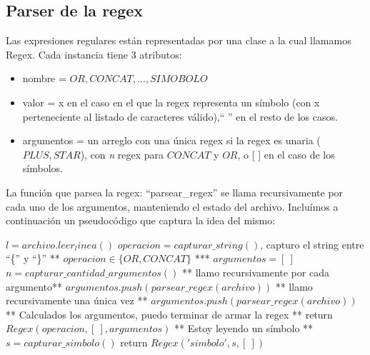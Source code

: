 \subsection{Parser de la regex}
Las expresiones regulares están representadas por una clase a la cual llamamos Regex.
Cada instancia tiene 3 atributos:
\begin{itemize}
	\item nombre = $OR, CONCAT, \ldots , SIMOBOLO$
	\item valor = x en el caso en el que la regex representa un símbolo (con x perteneciente al listado de caracteres válido),`` '' en el resto de los casos.
	\item argumentos = un arreglo con una única regex si la regex es unaria ($PLUS, STAR$), con \emph{n} regex para $CONCAT$ y $OR$, o [ ] en el caso de los símbolos.
\end{itemize}
La función que parsea la regex: ``parsear\_regex'' se llama recursivamente por cada uno de los argumentos, manteniendo el estado del archivo. Incluímos a continuación un pseudocódigo que captura la idea del mismo:

\begin{algorithm}
  \begin{algorithmic}
      \State $l = archivo.leer_linea()$
        \State $operacion = capturar\_string()$, capturo el string entre ``\{'' y ``\}''
          \State \/** $operacion \in \{OR, CONCAT\}$ \/***
          \State $argumentos = [ \ ]$
          \State $n = capturar\_cantidad\_argumentos()$
            \State \/** llamo recursivamente por cada argumento\/**
            \State $argumentos.push(parsear\_regex(archivo))$
          \EndFor
        \Else
          \State \/** llamo recursivamente una única vez \/**
            \State $argumentos.push(parsear\_regex(archivo))$
        \EndIf
        \State \/** Calculados los argumentos, puedo terminar de armar la regex \/**
        \State return $Regex(operacion, [ \ ], argumentos)$
      \Else
        \State \/** Estoy leyendo un símbolo \/**
        \State $s = capturar\_simbolo()$
        \State return $Regex('simbolo', s, [ \ ])$
      \EndIf
    \EndFunction
  \end{algorithmic}
\end{algorithm}


